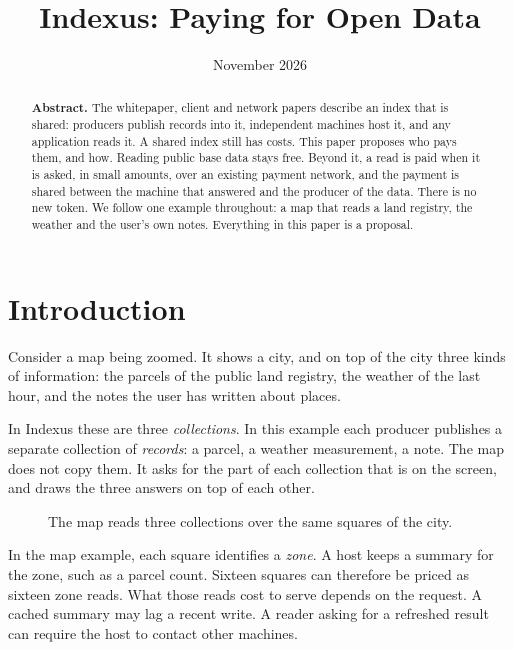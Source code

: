\documentclass[11pt]{article}
\newcommand{\fig}[4][]{\begin{figure}[H]\centering\vspace{0.3em}\ixnew{figures/#2.tikz}\caption{#3}\label{fig:#4}\end{figure}}
\begin{document}
\title{Indexus: Paying for Open Data}
\author{\ixbyline}
\date{November 2026}
\maketitle

\begin{abstract}
\noindent \textbf{Abstract. }The whitepaper, client and network papers describe an index that is shared: producers publish records into it, independent machines host it, and any application reads it. A shared index still has costs. This paper proposes who pays them, and how. Reading public base data stays free. Beyond it, a read is paid when it is asked, in small amounts, over an existing payment network, and the payment is shared between the machine that answered and the producer of the data. There is no new token. We follow one example throughout: a map that reads a land registry, the weather and the user's own notes. Everything in this paper is a proposal.
\vspace{1em}\end{abstract}

\section{Introduction}

Consider a map being zoomed. It shows a city, and on top of the city three kinds of information: the parcels of the public land registry, the weather of the last hour, and the notes the user has written about places.

In Indexus these are three \emph{collections}. In this example each producer publishes a separate collection of \emph{records}: a parcel, a weather measurement, a note. The map does not copy them. It asks for the part of each collection that is on the screen, and draws the three answers on top of each other.

\fig{layers}{The map reads three collections over the same squares of the city.}{layers}

In the map example, each square identifies a \emph{zone}. A host keeps a summary for the zone, such as a parcel count. Sixteen squares can therefore be priced as sixteen zone reads. What those reads cost to serve depends on the request. A cached summary may lag a recent write. A reader asking for a refreshed result can require the host to contact other machines.
\end{document}
